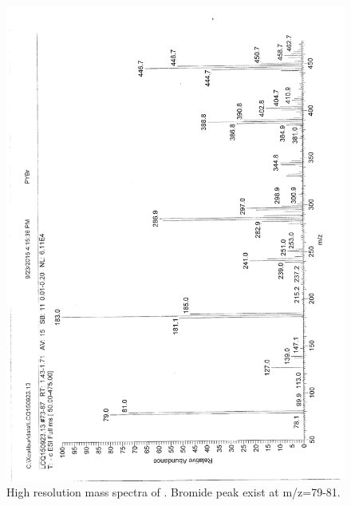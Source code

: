 \documentclass[journal=jacsat,manuscript=article]{achemso}
\begin{document}
\begin{figure}
\includegraphics[height=\textheight-2\baselineskip]{mass_PPyBr.png}
\caption{High resolution mass spectra of . Bromide peak exist at m/z=79-81.}
\label{fig:massPPyBr}
\end{figure}
\end{document}
